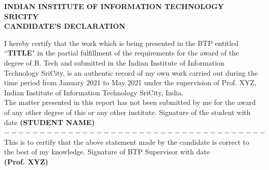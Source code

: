 \documentclass[a4paper,twoside,12pt]{report}
\begin{document}
   \hfill
   \begin{minipage}[t]{1.06\linewidth}
     \centering
     \vspace{-12.5ex}
        \baselineskip
              {\hspace{12ex} \normalsize \textbf{INDIAN INSTITUTE OF INFORMATION TECHNOLOGY SRICITY}}\\
              \vspace{1cm}
              {\hspace{6ex} \normalsize \textbf{CANDIDATE'S DECLARATION}}\\
   \end{minipage}

I hereby certify that the work which is being presented in the BTP entitled \newline``{\textbf{TITLE}}" in the partial fulfillment of the requirements for the award of the degree of B. Tech and submitted in the Indian Institute of Information Technology SriCity, is an authentic record of my own work carried out during the time period from January 2021 to May 2021 under the supervision of Prof. XYZ, Indian Institute of Information Technology SriCity, India.\\
The matter presented in this report has not been submitted by me for the award of any other degree of this or any other institute.\newline
\hspace*{9.3cm}                         {\footnotesize Signature of the student with date}\newline
\hspace*{10cm}                                                    \textbf{(STUDENT NAME)}\newline
$-------------------------------------$
\newline
This is to certify that the above statement made by the candidate is correct to the best of my knowledge.\newline
\hspace*{8.2cm}                                                     {\footnotesize Signature of BTP Supervisor with date}\\
\hspace*{10cm}                                                   \textbf{(Prof. XYZ)}\newline
\end{document}
